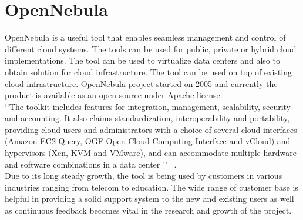 \section{OpenNebula}

OpenNebula is a useful tool that enables seamless management and control of different cloud systems.
The tools can be used for public, private or hybrid cloud implementations.
The tool can be used to virtualize data centers and also to obtain solution for cloud infrastructure.
The tool can be used on top of existing cloud infrastructure.
OpenNebula project started on 2005 and currently the product is available as an open-source under Apache license. \\
‘‘The toolkit includes features for integration, management, scalability, security and accounting.
It also claims standardization, interoperability and portability, providing cloud users and administrators with a choice of several
cloud interfaces (Amazon EC2 Query, OGF Open Cloud Computing Interface and vCloud) and hypervisors
(Xen, KVM and VMware), and can accommodate multiple hardware and software combinations in a data center ’’
~\cite{hid-sp18-417-opennebula-wiki}.\\
Due to its long steady growth, the tool is being used by customers in various industries ranging from telecom to education.
The wide range of customer base is helpful in providing a solid support system to the new and existing users as well as continuous
feedback becomes vital in the research and growth of the project. 
